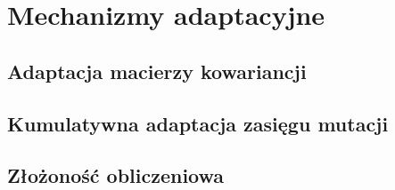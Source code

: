 \section{Mechanizmy adaptacyjne}
\subsection{Adaptacja macierzy kowariancji}
\subsection{Kumulatywna adaptacja zasięgu mutacji}
\subsection{Złożoność obliczeniowa}
